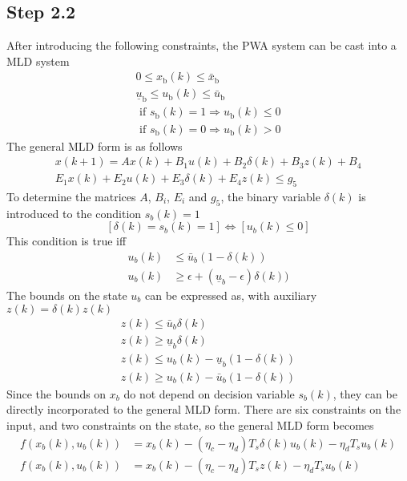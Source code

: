 \subsection*{Step 2.2}
After introducing the following constraints, the PWA system can be cast into a MLD system
$$
\begin{array}{l}
0 \leq x_{\mathrm{b}}(k) \leq \bar{x}_{\mathrm{b}} \\
\underline{u}_{\mathrm{b}} \leq u_{\mathrm{b}}(k) \leq \bar{u}_{\mathrm{b}} \\
\text { if } s_{\mathrm{b}}(k)=1 \Rightarrow u_{\mathrm{b}}(k) \leq 0 \\
\text { if } s_{\mathrm{b}}(k)=0 \Rightarrow u_{\mathrm{b}}(k)>0
\end{array}
$$
The general MLD form is as follows
$$
\begin{array}{l}
x(k+1)=A x(k)+B_{1} u(k)+B_{2} \delta(k)+B_{3} z(k)+B_{4} \\
E_{1} x(k)+E_{2} u(k)+E_{3} \delta(k)+E_{4} z(k) \leq g_{5}
\end{array}
$$
To determine the matrices $A$, $B_i$, $E_i$ and $g_5$, the binary variable $\delta(k)$ is introduced to the condition $s_b(k) = 1$
$$
[\delta(k) = s_b(k) = 1] \Leftrightarrow [u_b(k) \leq 0]
$$
This condition is true iff
\begin{align*}
u_b(k) &\leq \bar{u}_b(1-\delta(k))\\
u_b(k) &\geq \epsilon + (\underline{u}_b-\epsilon)\delta(k))
\end{align*}
The bounds on the state $u_b$ can be expressed as, with auxiliary $z(k) = \delta(k)z(k)$
$$
\begin{array}{l}
z(k) \leq \bar{u}_b \delta(k) \\
z(k) \geq \underline{u}_b \delta(k) \\
z(k) \leq u_b(k)-\underline{u}_b(1-\delta(k)) \\
z(k) \geq u_b(k)-\bar{u}_b(1-\delta(k))
\end{array}
$$
Since the bounds on $x_b$ do not depend on decision variable $s_b(k)$, they can be directly incorporated to the general MLD form. There are six constraints on the input, and two constraints on the state, so the general MLD form becomes
\begin{align}
    f(x_b(k),u_b(k)) &= x_b(k) - (\eta_c - \eta_d)T_s\delta(k)u_b(k) - \eta_dT_su_b(k) \nonumber\\
    f(x_b(k),u_b(k)) &= x_b(k) - (\eta_c - \eta_d)T_sz(k) - \eta_dT_su_b(k) \label{eq:2.1MLDdynamics}
\end{align}
